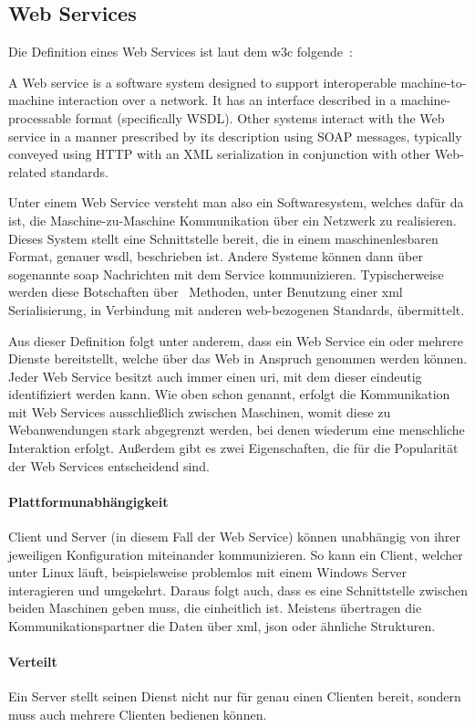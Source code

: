 \subsection{Web Services}\label{subsec:web-services}
	Die Definition eines Web Services ist laut dem \gls{w3c}
	folgende~\cite{WebServiceW3C}:
	\begin{displayquote}
		A Web service is a software system designed to support interoperable machine-to-machine interaction over a network.
		It has an interface described in a machine-processable format (specifically WSDL).
		Other systems interact with the Web service in a manner prescribed by its description using SOAP messages,
		typically conveyed using HTTP with an XML serialization in conjunction with other Web-related standards.
	\end{displayquote}
	Unter einem Web Service versteht man also ein Softwaresystem,
	welches dafür da ist,
	die Maschine-zu-Maschine Kommunikation über ein Netzwerk zu realisieren.
	Dieses System stellt eine Schnittstelle bereit,
	die in einem maschinenlesbaren Format,
	genauer \gls{wsdl},
	beschrieben ist.
	Andere Systeme können dann über sogenannte \gls{soap} Nachrichten mit dem Service kommunizieren.
	Typischerweise werden diese Botschaften über~ Methoden,
	unter Benutzung einer \gls{xml} Serialisierung,
	in Verbindung mit anderen web-bezogenen Standards,
	übermittelt. \par
	Aus dieser Definition folgt unter anderem,
	dass ein Web Service ein oder mehrere Dienste bereitstellt,
	welche über das Web in Anspruch genommen werden können.
	Jeder Web Service besitzt auch immer einen \gls{uri},
	mit dem dieser eindeutig identifiziert werden kann.
	Wie oben schon genannt,
	erfolgt die Kommunikation mit Web Services ausschließlich zwischen Maschinen,
	womit diese zu Webanwendungen stark abgegrenzt werden,
	bei denen wiederum eine menschliche Interaktion erfolgt.
	Außerdem gibt es zwei Eigenschaften,
	die für die Popularität der Web Services entscheidend sind.

	\paragraph{Plattformunabhängigkeit}
		Client und Server (in diesem Fall der Web Service) können unabhängig
		von ihrer jeweiligen Konfiguration miteinander kommunizieren.
		So kann ein Client, welcher unter Linux läuft,
		beispielsweise problemlos mit einem Windows Server interagieren und umgekehrt.
		Daraus folgt auch,
		dass es eine Schnittstelle zwischen beiden Maschinen geben muss,
		die einheitlich ist.
		Meistens übertragen die Kommunikationspartner die Daten über \gls{xml}, \gls{json} oder ähnliche Strukturen.

	\paragraph{Verteilt}
		Ein Server stellt seinen Dienst nicht nur für genau einen Clienten bereit,
		sondern muss auch mehrere Clienten bedienen können.